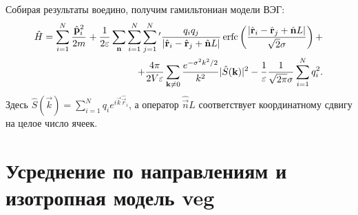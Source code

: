 Собирая результаты воедино, получим гамильтониан модели ВЭГ:
\begin{equation}
    \label{eq:jel:ham_final}
    \begin{aligned}
        \hat{H} = \sum\limits_{i=1}^{N} \cfrac{\hat{\vec{p}}_{i}^2}{2m}\, +
        \frac{1}{2 \epsilon} \sum_{\vec{n}} \sum_{i=1}^N \sum_{j=1}^N {}^\prime \frac{q_i q_j}{|\hat{\vec{r}}_i - \hat{\vec{r}}_j + \hat{\vec{n}}L|}\, \mathrm{erfc} \left( \frac{ |\hat{\vec{r}}_i - \hat{\vec{r}}_j + \hat{\vec{n}}L| }{ \sqrt{2} \sigma } \right) + \\
        + \frac{4\pi}{2V \epsilon} \sum_{\vec{k} \neq 0} \frac{e^{-\sigma^2 k^2 / 2}}{k^2} | \hat{S} (\vec{k}) |^2 - \frac{1}{\epsilon} \frac{1}{\sqrt{2\pi} \sigma} \sum_{i=1}^N q_i^2.
    \end{aligned}
\end{equation}
Здесь $\hat{S} (\vec{k}) = \sum\limits_{i=1}^{N} q_{i} e^{i \vec{k} \hat{\vec{r}}_{i}}$, а оператор $\hat{\vec{n}}L$ соответствует координатному сдвигу на целое число ячеек.

\section{Усреднение по направлениям и изотропная модель \texorpdfstring{\acrshort{veg}}{ВЭГ}}

